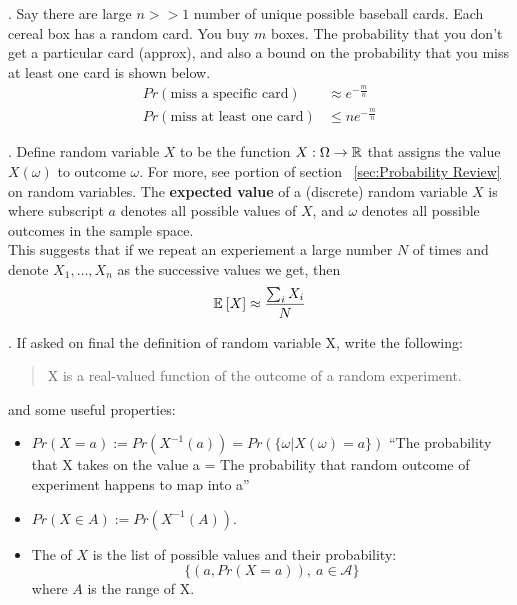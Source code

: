 \documentclass[12pt]{article}
\newcommand{\myspace}{\vspace{2\bigskipamount}}
\newcommand\p{\Needspace{12\baselineskip} \noindent}
\begin{document}
\myspace
\p {}. Say there are large $n >> 1$ number of unique possible baseball cards. Each cereal box has a random card. You buy $m$ boxes. The probability that you don't get a particular card (approx), and also a bound on the probability that you miss at least one card is shown below.
\begin{align}
	Pr(\text{miss a specific card}) &\approx e^{- \frac{m}{n} }  \\
	Pr(\text{miss at least one card}) &\le n e^{- \frac{m}{n} }  
\end{align}

\myspace
\p {}. Define random variable $X$ to be the function $X : \Omega \rightarrow \mathbb{R}$ that assigns the value $X(\omega)$ to outcome $\omega$. For more, see portion of section ~\ref{sec:Probability Review} on random variables. The \textbf{expected value} of a (discrete) random variable $X$ is 
where subscript $a$ denotes all possible values of $X$, and $\omega$ denotes all possible outcomes in the sample space. \\

This suggests that if we repeat an experiement a large number $N$ of times and denote $X_1, \ldots, X_n$ as the successive values we get, then
\begin{align}
	\mathbb{E}_{}\left[X\right] \approx \frac{\sum_i X_i}{N}
\end{align}

\myspace
\p {}. If asked on final the definition of random variable X, write the following:
\begin{quote}
	X is a real-valued function of the outcome of a random experiment.
\end{quote}
and some useful properties:
\begin{itemize}
	\item $Pr(X = a) := Pr(X^{-1}(a)) = Pr( \{ \omega | X(\omega) = a \} )$ ``The probability that X takes on the value a = The probability that random outcome of experiment happens to map into a''
	
	\item $Pr(X \in A) := Pr(X^{-1}(A))$. 
	
	\item The  of $X$ is the list of possible values and their probability: $$ \{ (a, Pr(X = a)), ~ a \in \mathcal{A}\}$$ where $A$ is the range of X. 
	
\end{itemize}
\end{document}
